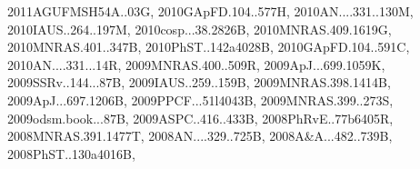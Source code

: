 \documentclass[12pt]{article}
\begin{document}
\begin{enumerate}
\begin{enumerate}
{2011AGUFMSH54A..03G,%
2010GApFD.104..577H,%
2010AN....331..130M,%
2010IAUS..264..197M,%
2010cosp...38.2826B,%
2010MNRAS.409.1619G,%
2010MNRAS.401..347B,%
2010PhST..142a4028B,%
2010GApFD.104..591C,%
2010AN....331...14R,%
2009MNRAS.400..509R,%
2009ApJ...699.1059K,%
2009SSRv..144...87B,%
2009IAUS..259..159B,%
2009MNRAS.398.1414B,%
2009ApJ...697.1206B,%
2009PPCF...51l4043B,%
2009MNRAS.399..273S,%
2009odsm.book...87B,%
2009ASPC..416..433B,%
2008PhRvE..77b6405R,%
2008MNRAS.391.1477T,%
2008AN....329..725B,%
2008A&A...482..739B,%
2008PhST..130a4016B,%
}
\end{enumerate}
\end{enumerate}
\end{document}
